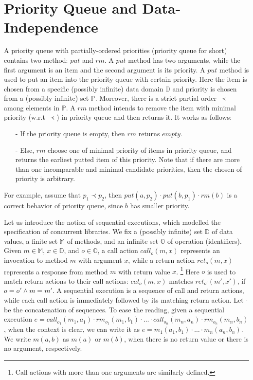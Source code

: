 \section{Priority Queue and Data-Independence}
\label{sec:priority queue and data-independence}


A priority queue with partially-ordered priorities (priority queue for short) contains two method: $\textit{put}$ and $\textit{rm}$. A $\textit{put}$ method has two arguments, while the first argument is an item and the second argument is its priority. A $\textit{put}$ method is used to put an item into the priority queue with certain priority. Here the item is chosen from a specific (possibly infinite) data domain $\mathbb{D}$ and priority is chosen from a (possibly infinite) set $\mathbb{P}$. Moreover, there is a strict partial-order $\prec$ among elements in $\mathbb{P}$. A $\textit{rm}$ method intends to remove the item with minimal priority (w.r.t $\prec$) in priority queue and then returns it. It works as follows: 

\begin{itemize}
\setlength{\itemsep}{0.5pt}
\item[-] If the priority queue is empty, then $\textit{rm}$ returns $\textit{empty}$.

\item[-] Else, $\textit{rm}$ choose one of minimal priority of items in priority queue, and returns the earliest putted item of this priority. Note that if there are more than one incomparable and minimal candidate priorities, then the chosen of priority is arbitrary.
\end{itemize} 

For example, assume that $p_1 \prec p_2$, then $\textit{put}(a,p_2) \cdot \textit{put}(b,p_1) \cdot \textit{rm}(b)$ is a correct behavior of priority queue, since $b$ has smaller priority. 

Let us introduce the notion of sequential executions, which modelled the specification of concurrent libraries. We fix a (possibly infinite) set $\mathbb{D}$ of data values, a finite set $\mathbb{M}$ of methods, and an infinite set $\mathbb{O}$ of operation (identifiers). Given $m \in \mathbb{M}$, $x \in \mathbb{D}$, and $o \in \mathbb{O}$, a call action $\textit{call}_o (m,x)$ represents an invocation to method $m$ with argument $x$, while a return action $\textit{ret}_o (m,x)$ represents a response from method $m$ with return value $x$. \footnote{Call actions with more than one arguments are similarly defined.} Here $o$ is used to match return actions to their call actions: $\textit{cal}_o (m,x)$ matches $\textit{ret}_{o'} (m',x')$, if $o=o' \wedge m=m'$. A sequential execution is a sequence of call and return actions, while each call action is immediately followed by its matching return action. Let $\cdot$ be the concatenation of sequences. To ease the reading, given a sequential execution $e=\textit{call}_{o_1}(m_1,a_1) \cdot \textit{rm}_{o_1}(m_1,b_1) \cdot \ldots \cdot \textit{call}_{o_n}(m_n,a_n) \cdot \textit{rm}_{o_n}(m_n,b_n)$, when the context is clear, we can write it as $e=m_1(a_1,b_1) \cdot \ldots \cdot m_n(a_n,b_n)$. We write $m(a,b)$ as $m(a)$ or $m(b)$, when there is no return value or there is no argument, respectively. 

